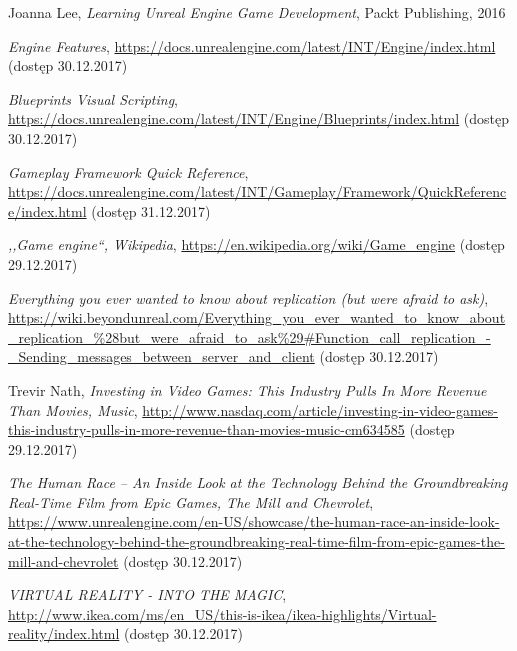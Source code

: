 \documentclass[multip]{SGGW-thesis}
\begin{document}
\begin{thebibliography}{9}

Joanna Lee, \textit{Learning Unreal Engine Game Development}, Packt Publishing, 2016

\textit{Engine Features}, \url{https://docs.unrealengine.com/latest/INT/Engine/index.html} (dostęp 30.12.2017)

\textit{Blueprints Visual Scripting}, \url{https://docs.unrealengine.com/latest/INT/Engine/Blueprints/index.html} (dostęp 30.12.2017)

\textit{Gameplay Framework Quick Reference}, \url{https://docs.unrealengine.com/latest/INT/Gameplay/Framework/QuickReference/index.html} (dostęp 31.12.2017)

\textit{,,Game engine``, Wikipedia}, \url{https://en.wikipedia.org/wiki/Game_engine} {\mbox(dostęp 29.12.2017)}

\textit{Everything you ever wanted to know about replication (but were afraid to ask)}, \url{https://wiki.beyondunreal.com/Everything_you_ever_wanted_to_know_about_replication_\%28but_were_afraid_to_ask\%29#Function_call_replication_-_Sending_messages_between_server_and_client} (dostęp 30.12.2017)

Trevir Nath, \textit{Investing in Video Games: This Industry Pulls In More Revenue Than Movies, Music},
\url{http://www.nasdaq.com/article/investing-in-video-games-this-industry-pulls-in-more-revenue-than-movies-music-cm634585} {\mbox(dostęp 29.12.2017)}

\textit{The Human Race – An Inside Look at the Technology Behind the Groundbreaking Real-Time Film from Epic Games, The Mill and Chevrolet}, \url{https://www.unrealengine.com/en-US/showcase/the-human-race-an-inside-look-at-the-technology-behind-the-groundbreaking-real-time-film-from-epic-games-the-mill-and-chevrolet} (dostęp 30.12.2017)

\textit{VIRTUAL REALITY - INTO THE MAGIC}, \url{http://www.ikea.com/ms/en_US/this-is-ikea/ikea-highlights/Virtual-reality/index.html} (dostęp 30.12.2017)

\end{thebibliography}

\beforelastpage
\end{document}
